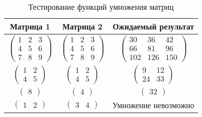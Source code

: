 \begin{table}[hb]
    \caption{\centering Тестирование функций умножения матриц}
    \centering
    \begin{tabular}{ccc}
    Матрица 1 & Матрица 2 & Ожидаемый результат \\ \hline
    $\begin{pmatrix}
        1 & 2 & 3 \\
        4 & 5 & 6 \\
        7 & 8 & 9
    \end{pmatrix}$
    &$\begin{pmatrix}
        1 & 2 & 3 \\
        4 & 5 & 6 \\
        7 & 8 & 9
    \end{pmatrix}$
    &$\begin{pmatrix}
        30 & 36 & 42 \\
        66 & 81 & 96 \\
        102 & 126 & 150
    \end{pmatrix}$\\
    $\begin{pmatrix}
        1 & 2 \\
        4 & 5
    \end{pmatrix}$
    &$\begin{pmatrix}
        1 & 2 \\
        4 & 5
    \end{pmatrix}$
    &$\begin{pmatrix}
        9 & 12 \\
        24 & 33
    \end{pmatrix}$\\
    $\begin{pmatrix}
        8
    \end{pmatrix}$
    &$\begin{pmatrix}
        4
    \end{pmatrix}$
    &$\begin{pmatrix}
        32
    \end{pmatrix}$\\
    $\begin{pmatrix} 1 & 2 \end{pmatrix}$ & $\begin{pmatrix} 3 & 4 \end{pmatrix}$ & Умножение невозможно
    \end{tabular}
    \label{tab:tests}
    \end{table}


